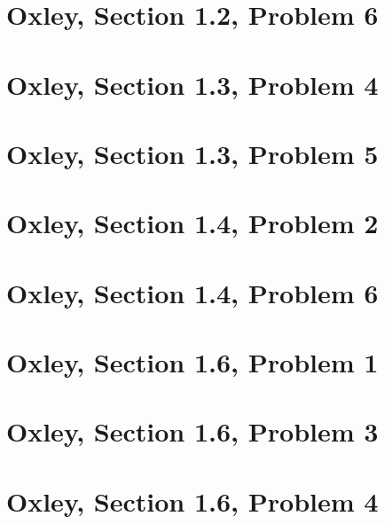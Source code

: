     \section{Oxley, Section 1.2, Problem 6}
        
        \clearpage

    \section{Oxley, Section 1.3, Problem 4}
        
        \clearpage

    \section{Oxley, Section 1.3, Problem 5}
        
        \clearpage

    \section{Oxley, Section 1.4, Problem 2}
        
        \clearpage

    \section{Oxley, Section 1.4, Problem 6}
        
        \clearpage

    \section{Oxley, Section 1.6, Problem 1}
        
        \clearpage

    \section{Oxley, Section 1.6, Problem 3}
        
        \clearpage

    \section{Oxley, Section 1.6, Problem 4}
        
        \clearpage


